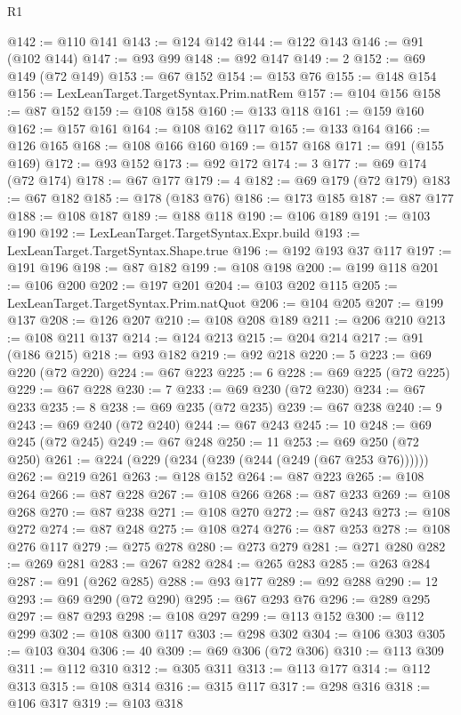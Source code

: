\begin{lexlean}{R1}
\begin{coremodule}
@142 := @110 @141
@143 := @124 @142
@144 := @122 @143
@146 := @91 (@102 @144)
@147 := @93 @99
@148 := @92 @147
@149 := 2
@152 := @69 @149 (@72 @149)
@153 := @67 @152
@154 := @153 @76
@155 := @148 @154
@156 := LexLeanTarget.TargetSyntax.Prim.natRem
@157 := @104 @156
@158 := @87 @152
@159 := @108 @158
@160 := @133 @118
@161 := @159 @160
@162 := @157 @161
@164 := @108 @162 @117
@165 := @133 @164
@166 := @126 @165
@168 := @108 @166 @160
@169 := @157 @168
@171 := @91 (@155 @169)
@172 := @93 @152
@173 := @92 @172
@174 := 3
@177 := @69 @174 (@72 @174)
@178 := @67 @177
@179 := 4
@182 := @69 @179 (@72 @179)
@183 := @67 @182
@185 := @178 (@183 @76)
@186 := @173 @185
@187 := @87 @177
@188 := @108 @187
@189 := @188 @118
@190 := @106 @189
@191 := @103 @190
@192 := LexLeanTarget.TargetSyntax.Expr.build
@193 := LexLeanTarget.TargetSyntax.Shape.true
@196 := @192 @193 @37 @117
@197 := @191 @196
@198 := @87 @182
@199 := @108 @198
@200 := @199 @118
@201 := @106 @200
@202 := @197 @201
@204 := @103 @202 @115
@205 := LexLeanTarget.TargetSyntax.Prim.natQuot
@206 := @104 @205
@207 := @199 @137
@208 := @126 @207
@210 := @108 @208 @189
@211 := @206 @210
@213 := @108 @211 @137
@214 := @124 @213
@215 := @204 @214
@217 := @91 (@186 @215)
@218 := @93 @182
@219 := @92 @218
@220 := 5
@223 := @69 @220 (@72 @220)
@224 := @67 @223
@225 := 6
@228 := @69 @225 (@72 @225)
@229 := @67 @228
@230 := 7
@233 := @69 @230 (@72 @230)
@234 := @67 @233
@235 := 8
@238 := @69 @235 (@72 @235)
@239 := @67 @238
@240 := 9
@243 := @69 @240 (@72 @240)
@244 := @67 @243
@245 := 10
@248 := @69 @245 (@72 @245)
@249 := @67 @248
@250 := 11
@253 := @69 @250 (@72 @250)
@261 := @224 (@229 (@234 (@239 (@244 (@249 (@67 @253 @76))))))
@262 := @219 @261
@263 := @128 @152
@264 := @87 @223
@265 := @108 @264
@266 := @87 @228
@267 := @108 @266
@268 := @87 @233
@269 := @108 @268
@270 := @87 @238
@271 := @108 @270
@272 := @87 @243
@273 := @108 @272
@274 := @87 @248
@275 := @108 @274
@276 := @87 @253
@278 := @108 @276 @117
@279 := @275 @278
@280 := @273 @279
@281 := @271 @280
@282 := @269 @281
@283 := @267 @282
@284 := @265 @283
@285 := @263 @284
@287 := @91 (@262 @285)
@288 := @93 @177
@289 := @92 @288
@290 := 12
@293 := @69 @290 (@72 @290)
@295 := @67 @293 @76
@296 := @289 @295
@297 := @87 @293
@298 := @108 @297
@299 := @113 @152
@300 := @112 @299
@302 := @108 @300 @117
@303 := @298 @302
@304 := @106 @303
@305 := @103 @304
@306 := 40
@309 := @69 @306 (@72 @306)
@310 := @113 @309
@311 := @112 @310
@312 := @305 @311
@313 := @113 @177
@314 := @112 @313
@315 := @108 @314
@316 := @315 @117
@317 := @298 @316
@318 := @106 @317
@319 := @103 @318

\end{coremodule}
\end{lexlean}

